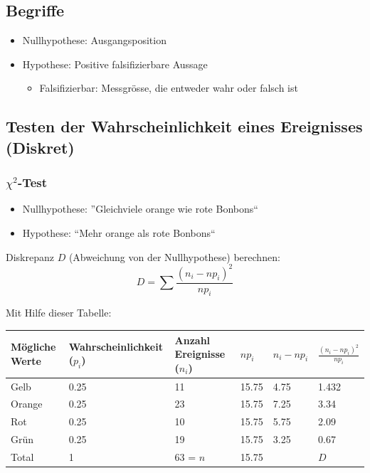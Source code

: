 \subsection{Begriffe}
\begin{itemize}
  \item Nullhypothese: Ausgangsposition
  \item Hypothese: Positive falsifizierbare Aussage
  \begin{itemize}
    \item Falsifizierbar: Messgrösse, die entweder wahr oder falsch ist
  \end{itemize}
\end{itemize}

\subsection{Testen der Wahrscheinlichkeit eines Ereignisses (Diskret)}
\subsubsection{$\chi^2$-Test}
\begin{itemize}
  \item Nullhypothese: ''Gleichviele orange wie rote Bonbons``
  \item Hypothese: ``Mehr orange als rote Bonbons``
\end{itemize}
Diskrepanz $D$ (Abweichung von der Nullhypothese) berechnen:
\[ D = \sum \frac{(n_i - np_i)^2}{np_i} \]

Mit Hilfe dieser Tabelle:

\begin{tabular}{|l|l|l|l|l|l|}
  \hline
  Mögliche Werte & Wahrscheinlichkeit ($p_i$) & Anzahl Ereignisse ($n_i$) & $np_i$ & $n_i - np_i$ & $\frac{(n_i - np_i)^2}{np_i}$ \\
  \hline
  \hline
  Gelb    &   0.25    &  11       &   15.75    &  4.75    &  1.432 \\
  Orange  &   0.25    &  23       &   15.75    &  7.25    &  3.34  \\
  Rot     &   0.25    &  10       &   15.75    &  5.75    &  2.09  \\
  Grün    &   0.25    &  19       &   15.75    &  3.25    &  0.67  \\
  \hline
  \hline
  Total   &   1       &  63 = $n$ &   15.75    &          & $D$    \\
  \hline
\end{tabular}


